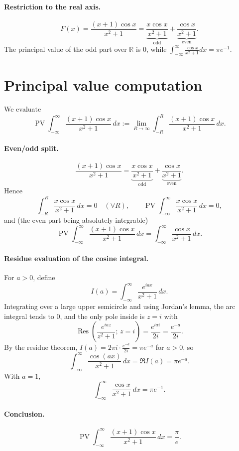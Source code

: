 \documentclass[12pt,a4paper]{article}
\newcommand{\R}{\mathbb{R}}
\begin{document}
\paragraph{Restriction to the real axis.}
\[
F(x)=\frac{(x+1)\cos x}{x^{2}+1}
=\underbrace{\frac{x\cos x}{x^{2}+1}}_{\text{odd}}
+\underbrace{\frac{\cos x}{x^{2}+1}}_{\text{even}}.
\]
The principal value of the odd part over \(\R\) is \(0\), while
\(\displaystyle \int_{-\infty}^{\infty}\frac{\cos x}{x^{2}+1}dx=\pi e^{-1}\).


\section*{Principal value computation}

We evaluate
\[
\operatorname{PV}\int_{-\infty}^{\infty}\frac{(x+1)\cos x}{x^{2}+1}\,dx
:=\lim_{R\to\infty}\int_{-R}^{R}\frac{(x+1)\cos x}{x^{2}+1}\,dx.
\]

\paragraph{Even/odd split.}
\[
\frac{(x+1)\cos x}{x^{2}+1}
=\underbrace{\frac{x\cos x}{x^{2}+1}}_{\text{odd}}
+\underbrace{\frac{\cos x}{x^{2}+1}}_{\text{even}}.
\]
Hence
\[
\int_{-R}^{R}\frac{x\cos x}{x^{2}+1}\,dx=0\quad(\forall R),\qquad
\operatorname{PV}\int_{-\infty}^{\infty}\frac{x\cos x}{x^{2}+1}\,dx=0,
\]
and (the even part being absolutely integrable)
\[
\operatorname{PV}\int_{-\infty}^{\infty}\frac{(x+1)\cos x}{x^{2}+1}\,dx
=\int_{-\infty}^{\infty}\frac{\cos x}{x^{2}+1}\,dx.
\]

\paragraph{Residue evaluation of the cosine integral.}
For $a>0$, define
\[
I(a)=\int_{-\infty}^{\infty}\frac{e^{iax}}{x^{2}+1}\,dx.
\]
Integrating over a large upper semicircle and using Jordan’s lemma, the arc integral tends to $0$, and the only pole inside is $z=i$ with
\[
\operatorname{Res}\!\left(\frac{e^{iaz}}{z^{2}+1};\,z=i\right)
=\frac{e^{iai}}{2i}=\frac{e^{-a}}{2i}.
\]
By the residue theorem, $I(a)=2\pi i\cdot \frac{e^{-a}}{2i}=\pi e^{-a}$ for $a>0$, so
\[
\int_{-\infty}^{\infty}\frac{\cos(ax)}{x^{2}+1}\,dx=\Re I(a)=\pi e^{-a}.
\]
With $a=1$,
\[
\int_{-\infty}^{\infty}\frac{\cos x}{x^{2}+1}\,dx=\pi e^{-1}.
\]

\paragraph{Conclusion.}
\[
\operatorname{PV}\int_{-\infty}^{\infty}\frac{(x+1)\cos x}{x^{2}+1}\,dx
=\frac{\pi}{e}.
\]
\end{document}
